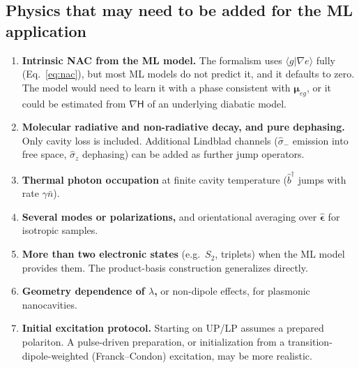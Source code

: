 \documentclass[11pt]{article}
\newcommand{\braket}[2]{\langle #1 \vert #2 \rangle}
\newcommand{\grad}{\nabla}
\newcommand{\bdag}{\hat b^{\dagger}}
\newcommand{\eps}{\hat{\bm{\epsilon}}}
\newcommand{\mub}{\bm{\mu}}
\newcommand{\Hm}{\mathsf{H}}
\begin{document}
\subsection{Physics that may need to be added for the ML application}
\begin{enumerate}
\item \textbf{Intrinsic NAC from the ML model.} The formalism uses $\braket{g}{\grad e}$ fully (Eq.~\ref{eq:nac}), but most ML models do not predict it, and it defaults to zero. The model would need to learn it with a phase consistent with $\mub_{eg}$, or it could be estimated from $\grad\Hm$ of an underlying diabatic model.
\item \textbf{Molecular radiative and non-radiative decay, and pure dephasing.} Only cavity loss is included. Additional Lindblad channels ($\hat\sigma_-$ emission into free space, $\hat\sigma_z$ dephasing) can be added as further jump operators.
\item \textbf{Thermal photon occupation} at finite cavity temperature ($\bdag$ jumps with rate $\gamma\bar n$).
\item \textbf{Several modes or polarizations,} and orientational averaging over $\eps$ for isotropic samples.
\item \textbf{More than two electronic states} (e.g.\ $S_2$, triplets) when the ML model provides them. The product-basis construction generalizes directly.
\item \textbf{Geometry dependence of $\lambda$,} or non-dipole effects, for plasmonic nanocavities.
\item \textbf{Initial excitation protocol.} Starting on UP/LP assumes a prepared polariton. A pulse-driven preparation, or initialization from a transition-dipole-weighted (Franck--Condon) excitation, may be more realistic.
\end{enumerate}

\appendix
\end{document}
